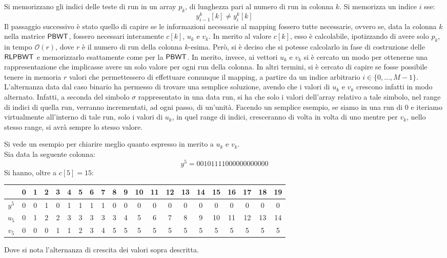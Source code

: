 Si memorizzano gli indici delle teste di run in un array $p_k$, di lunghezza
pari al numero di run in colonna $k$. Si memorizza un indice $i$ sse:
\begin{equation}
  \label{eq:naive1}
  y_{i-1}^k[k]\neq y_i^k[k]
\end{equation}
Il passaggio successivo è stato quello di capire se le informazioni necessarie
al mapping fossero tutte necessarie, ovvero se, data la colonna $k$
nella matrice $\mbox{\rm {\sf PBWT}}$, fossero necessari interamente $c[k]$, $u_k$ e $v_k$. In
merito 
al valore $c[k]$, esso è calcolabile, ipotizzando di avere solo $p_k$, in
tempo $\mathcal{O}(r)$, dove $r$ è 
il numero di run della colonna $k$-esima. Però, si è deciso che si potesse
calcolarlo 
in fase di costruzione delle $\mbox{\rm {\sf RLPBWT}}$ e memorizzarlo esattamente come per
la $\mbox{\rm {\sf PBWT}}$. In merito, invece, ai vettori $u_k$ e $v_k$ si è cercato un modo
per ottenerne una rappresentazione che implicasse avere un solo valore per ogni
run della colonna. In altri termini, si è cercato di capire se fosse possibile
tenere in memoria $r$ valori che permettessero di effettuare comunque il
mapping, a partire da un indice arbitrario $i\in\{0,\ldots,M-1\}$. L'alternanza
data dal caso binario ha permesso di trovare una 
semplice soluzione, avendo che i valori di $u_k$ e $v_k$ crescono infatti in
modo 
alternato. Infatti, a seconda del simbolo $\sigma$ rappresentato in una data
run, si ha che solo i valori dell'array relativo a tale simbolo, nel range di
indici di quella run, verranno incrementati, ad ogni passo, di un'unità. Facendo
un semplice esempio, se siamo in una run di 0 e iteriamo 
virtualmente all'interno di tale run, solo i valori di $u_k$, in quel
range di indici, cresceranno di volta in volta di uno mentre per $v_k$, nello
stesso range, si avrà sempre lo stesso valore.
\begin{esempio}
  Si vede un esempio per chiarire meglio quanto espresso in merito a $u_k$ e
  $v_k$.\\
  Sia data la seguente colonna:
  \[y^5=00101111000000000000\]
  Si hanno, oltre a $c[5]=15$:
  \begin{table}[H]
    \footnotesize
    \centering
    \begin{tabular}{c||cc|c|c|cccc|cccccccccccc}
      & 0 & 1 & 2 & 3 & 4 & 5 & 6 & 7 & 8 & 9 & 10 & 11 & 12 & 13 & 14 & 15 & 16
      & 17 & 18 & 19\\
      \hline
      \hline
      $y^5$ & 0 & 0 & 1 & 0 & 1 & 1 & 1 & 1 & 0 & 0 & 0 & 0 & 0 & 0 & 0 & 0 & 0
      & 0 & 0 & 0\\
      \hline
      \hline
      $u_5$ & 0 & 1 & 2 & 2 & 3 & 3 & 3 & 3 & 3 & 4 & 5 & 6 & 7 & 8 & 9 & 10
      & 11 & 12 & 13 & 14\\
      \hline
      $v_5$ & 0 & 0 & 0 & 1 & 1 & 2 & 3 & 4 & 5 & 5 & 5 & 5 & 5 & 5 & 5 & 5 & 5
      & 5 & 5 & 5
    \end{tabular}
  \end{table}
  Dove si nota l'alternanza di crescita dei valori sopra descritta.
\end{esempio}
